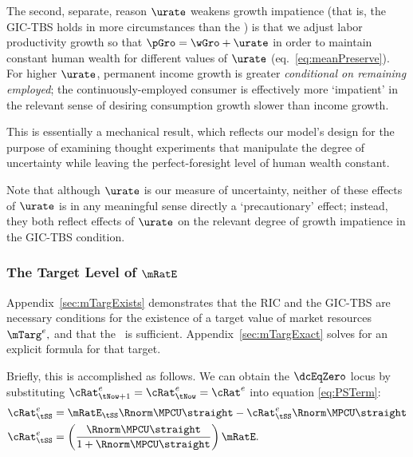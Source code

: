 \documentclass{\handout}
\begin{document}
The second, separate, reason $\urate$ weakens growth impatience (that is, the GIC-TBS holds in more circumstances than the \GICWGro) is that we adjust labor productivity growth so that $\pGro=\wGro+\urate$ in 
order to maintain constant human wealth for different values of
$\urate$ (eq.\ \eqref{eq:meanPreserve}).  For higher
$\urate$, permanent income growth is greater {\it conditional on
  remaining employed}; the continuously-employed consumer is effectively
more `impatient' in the relevant sense of desiring consumption growth
slower than income growth.

This is essentially a mechanical result, which reflects our model's
design for the purpose of examining thought experiments that
manipulate the degree of uncertainty while leaving the
perfect-foresight level of human wealth constant.  

Note that although $\urate$ is our measure of uncertainty, neither of 
these effects of $\urate$ is in any meaningful sense directly a 
`precautionary' effect; instead, they both reflect effects of 
$\urate$ on the relevant degree of growth impatience in the GIC-TBS 
condition.  

\subsubsection{The Target Level of $\mRatE$}

Appendix~\ref{sec:mTargExists} demonstrates that the RIC and the GIC-TBS are necessary conditions for the existence of a target value of market resources $\mTarg^{e},$ and that the \GICPGro~is sufficient.   Appendix~\ref{sec:mTargExact} solves for an explicit formula for that target.

Briefly, this is accomplished as follows.  We can obtain the $\dcEqZero$ locus by substituting
${\cRat}^{e}_{\tNow+1}={\cRat}^{e}_{\tNow}={\cRat}^{e}$ into equation \eqref{eq:PSTerm}:
\begin{equation}\begin{gathered}\begin{aligned}
  {\cRat}^{e}_{\tSS} & =  \mRatE_{\tSS} \Rnorm\MPCU\straight - {\cRat}^{e}_{\tSS} \Rnorm\MPCU\straight
\\  {\cRat}^{e}_{\tSS} & =  \left(\frac{\Rnorm\MPCU\straight}{1+\Rnorm\MPCU\straight}\right)\mRatE.
  \label{eq:cDelEqZero} %
\end{aligned}\end{gathered}\end{equation}
\end{document}
